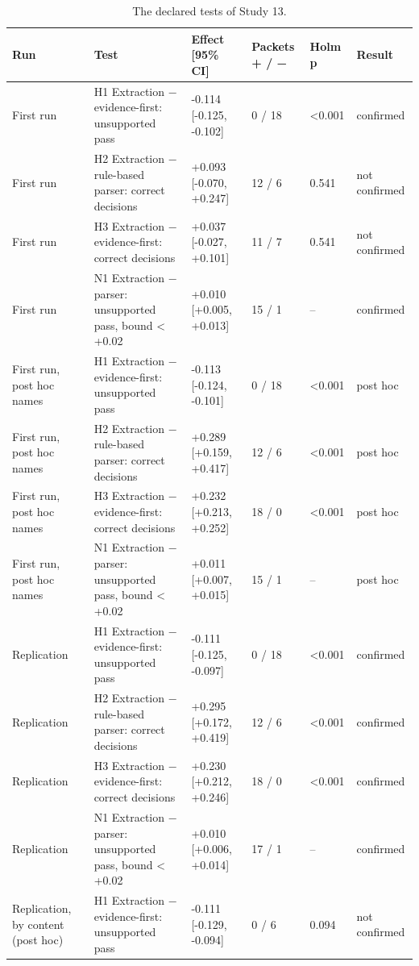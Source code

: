 \documentclass[10pt,twocolumn]{article}
\begin{document}
\begin{table}[t]
\centering\footnotesize\setlength{\tabcolsep}{4pt}
\caption{The declared tests of Study 13.}
\label{tab:9}
\begin{tabularx}{\textwidth}{>{\raggedright\arraybackslash}X>{\raggedright\arraybackslash}Xllll}
\toprule
\textbf{Run} & \textbf{Test} & \textbf{Effect [95\% CI]} & \textbf{Packets + / −} & \textbf{Holm p} & \textbf{Result} \\
\midrule
First run & H1 Extraction − evidence-first: unsupported pass & -0.114 [-0.125, -0.102] & 0 / 18 & <0.001 & confirmed \\
First run & H2 Extraction − rule-based parser: correct decisions & +0.093 [-0.070, +0.247] & 12 / 6 & 0.541 & not confirmed \\
First run & H3 Extraction − evidence-first: correct decisions & +0.037 [-0.027, +0.101] & 11 / 7 & 0.541 & not confirmed \\
First run & N1 Extraction − parser: unsupported pass, bound < +0.02 & +0.010 [+0.005, +0.013] & 15 / 1 & – & confirmed \\
First run, post hoc names & H1 Extraction − evidence-first: unsupported pass & -0.113 [-0.124, -0.101] & 0 / 18 & <0.001 & post hoc \\
First run, post hoc names & H2 Extraction − rule-based parser: correct decisions & +0.289 [+0.159, +0.417] & 12 / 6 & <0.001 & post hoc \\
First run, post hoc names & H3 Extraction − evidence-first: correct decisions & +0.232 [+0.213, +0.252] & 18 / 0 & <0.001 & post hoc \\
First run, post hoc names & N1 Extraction − parser: unsupported pass, bound < +0.02 & +0.011 [+0.007, +0.015] & 15 / 1 & – & post hoc \\
Replication & H1 Extraction − evidence-first: unsupported pass & -0.111 [-0.125, -0.097] & 0 / 18 & <0.001 & confirmed \\
Replication & H2 Extraction − rule-based parser: correct decisions & +0.295 [+0.172, +0.419] & 12 / 6 & <0.001 & confirmed \\
Replication & H3 Extraction − evidence-first: correct decisions & +0.230 [+0.212, +0.246] & 18 / 0 & <0.001 & confirmed \\
Replication & N1 Extraction − parser: unsupported pass, bound < +0.02 & +0.010 [+0.006, +0.014] & 17 / 1 & – & confirmed \\
Replication, by content (post hoc) & H1 Extraction − evidence-first: unsupported pass & -0.111 [-0.129, -0.094] & 0 / 6 & 0.094 & not confirmed \\

\end{tabularx}
\end{table}
\end{document}
